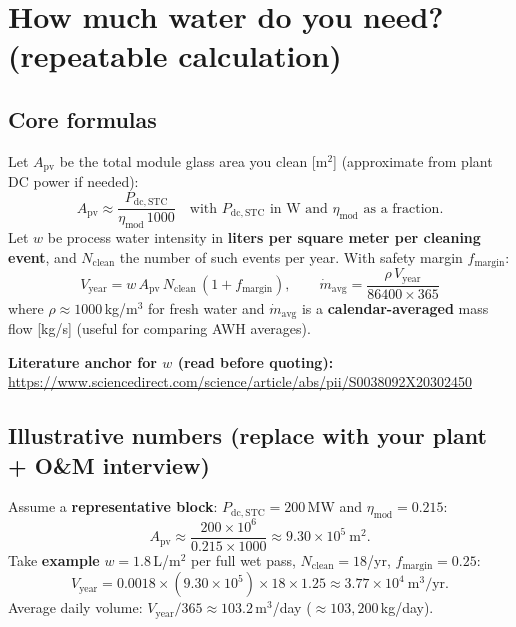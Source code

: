 \documentclass[11pt,a4paper]{article}
\begin{document}
\section{How much water do you need? (repeatable calculation)}
\subsection{Core formulas}
Let $A_{\mathrm{pv}}$ be the total module glass area you clean [m$^2$] (approximate from plant DC power if needed):
\begin{equation}
A_{\mathrm{pv}} \approx \frac{P_{\mathrm{dc,STC}}}{\eta_{\mathrm{mod}}\,1000}
\quad\text{with }P_{\mathrm{dc,STC}}\text{ in W and }\eta_{\mathrm{mod}}\text{ as a fraction.}
\end{equation}
Let $w$ be process water intensity in \textbf{liters per square meter per cleaning event}, and $N_{\mathrm{clean}}$ the number of such events per year. With safety margin $f_{\mathrm{margin}}$:
\begin{equation}
V_{\mathrm{year}} = w\,A_{\mathrm{pv}}\,N_{\mathrm{clean}}\,(1+f_{\mathrm{margin}}),
\qquad
\dot m_{\mathrm{avg}} = \frac{\rho\,V_{\mathrm{year}}}{86400\times 365}
\end{equation}
where $\rho\approx 1000$\,kg/m$^3$ for fresh water and $\dot m_{\mathrm{avg}}$ is a \textbf{calendar-averaged} mass flow [kg/s] (useful for comparing AWH averages).

\textbf{Literature anchor for $w$ (read before quoting):}\\
\url{https://www.sciencedirect.com/science/article/abs/pii/S0038092X20302450}

\subsection{Illustrative numbers (replace with your plant + O\&M interview)}
Assume a \textbf{representative block}: $P_{\mathrm{dc,STC}}=200$\,MW and $\eta_{\mathrm{mod}}=0.215$:
\begin{equation}
A_{\mathrm{pv}}\approx \frac{200\times 10^6}{0.215\times 1000}
\approx 9.30\times 10^5\ \mathrm{m^2}.
\end{equation}
Take \textbf{example} $w=1.8$\,L/m$^2$ per full wet pass, $N_{\mathrm{clean}}=18$/yr, $f_{\mathrm{margin}}=0.25$:
\begin{equation}
V_{\mathrm{year}} = 0.0018 \times (9.30\times 10^5)\times 18 \times 1.25
\approx 3.77\times 10^4\ \mathrm{m^3/yr}.
\end{equation}
Average daily volume: $V_{\mathrm{year}}/365 \approx 103.2$\,m$^3$/day ($\approx 103{,}200$\,kg/day).
\end{document}
